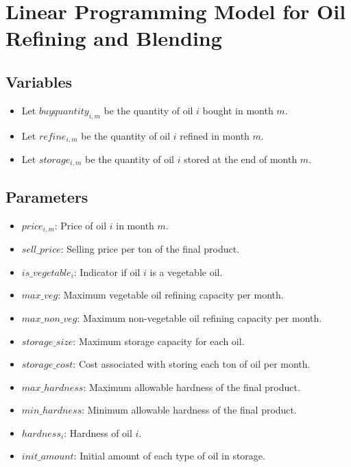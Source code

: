\documentclass{article}
\begin{document}
\section*{Linear Programming Model for Oil Refining and Blending}

\subsection*{Variables}
\begin{itemize}
    \item Let \( buyquantity_{i,m} \) be the quantity of oil \( i \) bought in month \( m \).
    \item Let \( refine_{i,m} \) be the quantity of oil \( i \) refined in month \( m \).
    \item Let \( storage_{i,m} \) be the quantity of oil \( i \) stored at the end of month \( m \).
\end{itemize}

\subsection*{Parameters}
\begin{itemize}
    \item \( price_{i,m} \): Price of oil \( i \) in month \( m \).
    \item \( sell\_price \): Selling price per ton of the final product.
    \item \( is\_vegetable_{i} \): Indicator if oil \( i \) is a vegetable oil.
    \item \( max\_veg \): Maximum vegetable oil refining capacity per month.
    \item \( max\_non\_veg \): Maximum non-vegetable oil refining capacity per month.
    \item \( storage\_size \): Maximum storage capacity for each oil.
    \item \( storage\_cost \): Cost associated with storing each ton of oil per month.
    \item \( max\_hardness \): Maximum allowable hardness of the final product.
    \item \( min\_hardness \): Minimum allowable hardness of the final product.
    \item \( hardness_{i} \): Hardness of oil \( i \).
    \item \( init\_amount \): Initial amount of each type of oil in storage.
\end{itemize}
\end{document}
